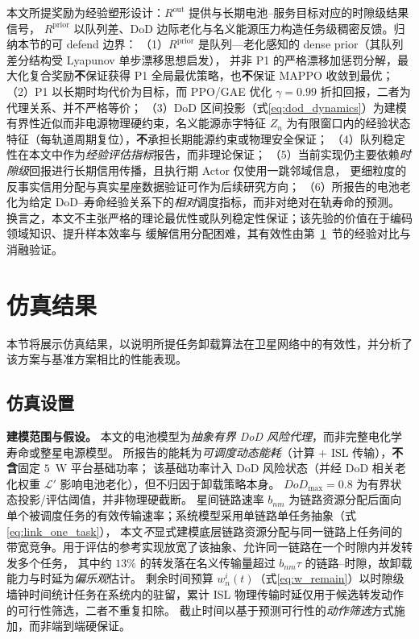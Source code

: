 \documentclass[a4paper,11pt]{article}
\begin{document}
本文所提奖励为经验塑形设计：$R^{\mathrm{out}}$ 提供与长期电池--服务目标对应的时隙级结果信号，
$R^{\mathrm{prior}}$ 以队列差、DoD 边际老化与名义能源压力构造任务级稠密反馈。归纳本节的可 defend 边界：
（1）$R^{\mathrm{prior}}$ 是队列—老化感知的 dense prior（其队列差分结构受 Lyapunov 单步漂移思想启发），
并非 P1 的严格漂移加惩罚分解，最大化复合奖励\textbf{不}保证获得 P1 全局最优策略，也\textbf{不}保证 MAPPO 收敛到最优；
（2）P1 以长期时均代价为目标，而 PPO/GAE 优化 $\gamma{=}0.99$ 折扣回报，二者为代理关系、并不严格等价；
（3）DoD 区间投影（式\eqref{eq:dod_dynamics}）为建模有界性近似而非电源物理硬约束，名义能源赤字特征
$Z_n$ 为有限窗口内的经验状态特征（每轨道周期复位），\textbf{不}承担长期能源约束或物理安全保证；
（4）队列稳定性在本文中作为\emph{经验评估指标}报告，而非理论保证；
（5）当前实现仍主要依赖\emph{时隙级}回报进行长期信用传播，且执行期 Actor 仅使用一跳邻域信息，
更细粒度的反事实信用分配与真实星座数据验证可作为后续研究方向；
（6）所报告的电池老化为给定 DoD--寿命经验关系下的\emph{相对}调度指标，而非对绝对在轨寿命的预测。
换言之，本文不主张严格的理论最优性或队列稳定性保证；该先验的价值在于编码领域知识、提升样本效率与
缓解信用分配困难，其有效性由第~\ref{sec:simulation}~节的经验对比与消融验证。

\section{仿真结果}
\label{sec:simulation}
本节将展示仿真结果，以说明所提任务卸载算法在卫星网络中的有效性，并分析了该方案与基准方案相比的性能表现。
\subsection{仿真设置}
\label{subsec:sim_setup}

\noindent\textbf{建模范围与假设。}
本文的电池模型为\emph{抽象有界 DoD 风险代理}，而非完整电化学寿命或整星电源模型。
所报告的能耗为\emph{可调度动态能耗}（计算 $+$ ISL 传输），\textbf{不含}固定 $5$~W 平台基础功率；
该基础功率计入 DoD 风险状态（并经 DoD 相关老化权重 $\mathcal{L}'$ 影响电池老化），但不归因于卸载策略本身。
$DoD_{\max}=0.8$ 为有界状态投影/评估阈值，并非物理硬截断。
星间链路速率 $b_{nm}$ 为链路资源分配后面向单个被调度任务的有效传输速率；系统模型采用单链路单任务抽象（式\eqref{eq:link_one_task}），
本文\emph{不}显式建模底层链路资源分配与同一链路上任务间的带宽竞争。用于评估的参考实现放宽了该抽象、允许同一链路在一个时隙内并发转发多个任务，
其中约 $13\%$ 的转发落在名义传输量超过 $b_{nm}\tau$ 的链路--时隙，故卸载能力与时延为\emph{偏乐观}估计。
剩余时间预算 $w^i_n(t)$（式\eqref{eq:w_remain}）以时隙级墙钟时间统计任务在系统内的驻留，累计 ISL 物理传输时延仅用于候选转发动作的可行性筛选，二者不重复扣除。
截止时间以基于预测可行性的\emph{动作筛选}方式施加，而非端到端硬保证。
\end{document}
